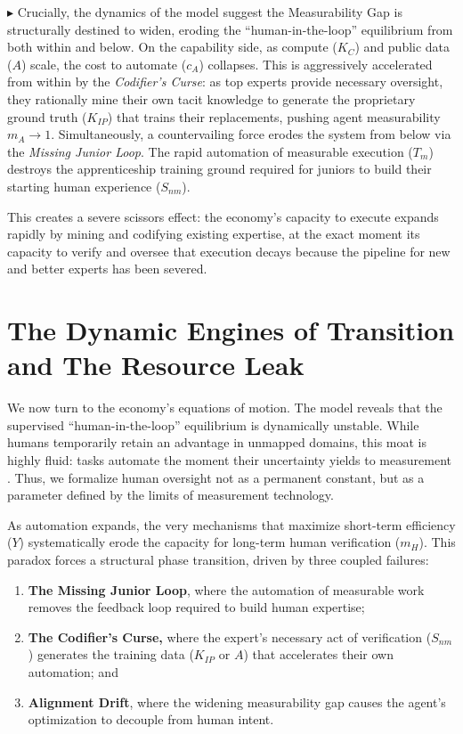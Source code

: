 \documentclass[12pt, letter]{article}
\begin{document}
$\blacktriangleright$ Crucially, the dynamics of the model suggest the Measurability Gap is structurally destined to widen, eroding the ``human-in-the-loop'' equilibrium from both within and below. On the capability side, as compute ($K_C$) and public data ($A$) scale, the cost to automate ($c_A$) collapses. This is aggressively accelerated from within by the \emph{Codifier's Curse}: as top experts provide necessary oversight, they rationally mine their own tacit knowledge to generate the proprietary ground truth ($K_{IP}$) that trains their replacements, pushing agent measurability $m_A \to 1$. Simultaneously, a countervailing force erodes the system from below via the \emph{Missing Junior Loop}. The rapid automation of measurable execution ($T_m$) destroys the apprenticeship training ground required for juniors to build their starting human experience ($S_{nm}$). 

This creates a severe scissors effect: the economy's capacity to execute expands rapidly by mining and codifying existing expertise, at the exact moment its capacity to verify and oversee that execution decays because the pipeline for new and better experts has been severed.

\clearpage

\section{The Dynamic Engines of Transition and The Resource Leak}\label{sec:engines_transition}

We now turn to the economy's equations of motion. The model reveals that the supervised ``human-in-the-loop'' equilibrium is dynamically unstable. While humans temporarily retain an advantage in unmapped domains, this moat is highly fluid: tasks automate the moment their uncertainty yields to measurement \citep{Catalini2025}. Thus, we formalize human oversight not as a permanent constant, but as a parameter defined by the limits of measurement technology.

As automation expands, the very mechanisms that maximize short-term efficiency ($Y$) systematically erode the capacity for long-term human verification ($m_H$). This paradox forces a structural phase transition, driven by three coupled failures:
 
\begin{enumerate}

\item \textbf{The Missing Junior Loop}, where the automation of measurable work removes the feedback loop required to build human expertise; 

\item \textbf{The Codifier's Curse,} where the expert's necessary act of verification ($S_{nm}$) generates the training data ($K_{IP}$ or $A$) that accelerates their own automation; and

\item \textbf{Alignment Drift}, where the widening measurability gap causes the agent's optimization to decouple from human intent. 

\end{enumerate}
\end{document}
